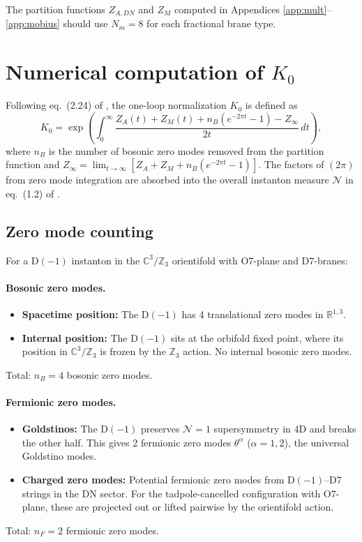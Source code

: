 \documentclass[11pt]{article}
\newcommand{\Z}{\mathbb{Z}}
\newcommand{\C}{\mathbb{C}}
\newcommand{\R}{\mathbb{R}}
\begin{document}
The partition functions $Z_{A,DN}$ and $Z_M$ computed in Appendices \ref{app:mult}--\ref{app:mobius} should use $N_m = 8$ for each fractional brane type.

\section{Numerical computation of $K_0$}
\label{sec:K0}

Following eq.~(2.24) of \cite{Sen:2021tpp}, the one-loop normalization $K_0$ is defined as
\begin{equation}\label{eq:K0def}
K_0 = \exp\left( \int_0^\infty \frac{Z_A(t) + Z_M(t) + n_B(e^{-2\pi t} - 1) - Z_\infty}{2t}\, dt \right),
\end{equation}
where $n_B$ is the number of bosonic zero modes removed from the partition function and $Z_\infty = \lim_{t\to\infty}[Z_A + Z_M + n_B(e^{-2\pi t}-1)]$. The factors of $(2\pi)$ from zero mode integration are absorbed into the overall instanton measure $\mathcal{N}$ in eq.~(1.2) of \cite{Sen:2021tpp}.

\subsection{Zero mode counting}

For a D$(-1)$ instanton in the $\C^3/\Z_3$ orientifold with O7-plane and D7-branes:

\paragraph{Bosonic zero modes.}
\begin{itemize}
\item \textbf{Spacetime position:} The D$(-1)$ has 4 translational zero modes in $\R^{1,3}$.
\item \textbf{Internal position:} The D$(-1)$ sits at the orbifold fixed point, where its position in $\C^3/\Z_3$ is frozen by the $\Z_3$ action. No internal bosonic zero modes.
\end{itemize}
Total: $n_B = 4$ bosonic zero modes.

\paragraph{Fermionic zero modes.}
\begin{itemize}
\item \textbf{Goldstinos:} The D$(-1)$ preserves $\mathcal{N}=1$ supersymmetry in 4D and breaks the other half. This gives 2 fermionic zero modes $\theta^\alpha$ ($\alpha = 1,2$), the universal Goldstino modes.
\item \textbf{Charged zero modes:} Potential fermionic zero modes from D$(-1)$--D7 strings in the DN sector. For the tadpole-cancelled configuration with O7-plane, these are projected out or lifted pairwise by the orientifold action.
\end{itemize}
Total: $n_F = 2$ fermionic zero modes.
\end{document}
